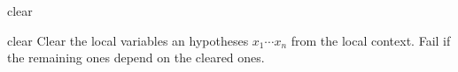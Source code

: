 \begin{tactic}{clear}
  \begin{tsyntax}[empty]{clear}
  Clear the local variables an hypotheses $x_1 \cdots x_n$ from the 
  local context. Fail if the remaining ones depend on the cleared ones.
  \end{tsyntax}
\end{tactic}

